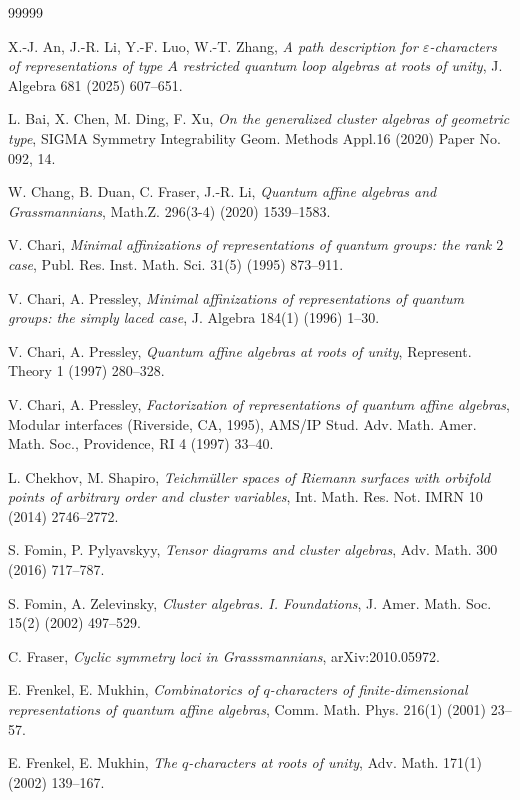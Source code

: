 \documentclass[11pt, reqno]{amsart}
\theoremstyle{plain}
\theoremstyle{definition}
\numberwithin{equation}{section}
\begin{document}
\begin{thebibliography}{99999}

 X.-J. An, J.-R. Li, Y.-F. Luo, W.-T. Zhang, \textit{A path description for $\varepsilon$-characters of representations of type $A$ restricted quantum loop algebras at roots of unity}, J. Algebra 681 (2025) 607--651.

 L. Bai, X. Chen, M. Ding, F. Xu, \textit{On the generalized cluster algebras of geometric type}, SIGMA Symmetry Integrability Geom. Methods Appl.16 (2020) Paper No. 092, 14.

 W. Chang, B. Duan, C. Fraser, J.-R. Li, \textit{Quantum affine algebras and {G}rassmannians}, Math.Z. 296(3-4) (2020) 1539--1583.

 V. Chari, \textit{Minimal affinizations of representations of quantum groups: the rank {$2$} case}, Publ. Res. Inst. Math. Sci. 31(5) (1995) 873--911.

 V. Chari, A. Pressley, \textit{Minimal affinizations of representations of quantum groups: the simply laced case}, J. Algebra 184(1) (1996) 1--30.

 V. Chari, A. Pressley, \textit{Quantum affine algebras at roots of unity}, Represent. Theory 1 (1997) 280--328.

 V. Chari, A. Pressley, \textit{Factorization of representations of quantum affine algebras}, Modular interfaces ({R}iverside, {CA}, 1995), AMS/IP Stud. Adv. Math. Amer. Math. Soc., Providence, RI 4 (1997) 33--40.
 
 L. Chekhov, M. Shapiro, \textit{Teichm\"uller spaces of {R}iemann surfaces with orbifold points of arbitrary order and cluster variables}, Int. Math. Res. Not. IMRN 10 (2014) 2746--2772.

 S. Fomin, P. Pylyavskyy, \textit{Tensor diagrams and cluster algebras}, Adv. Math. 300 (2016) 717--787.

 S. Fomin, A. Zelevinsky, \textit{Cluster algebras. {I}. {F}oundations}, J. Amer. Math. Soc. 15(2) (2002) 497--529.

 C. Fraser, \textit{Cyclic symmetry loci in Grasssmannians}, arXiv:2010.05972. 

 E. Frenkel, E. Mukhin, \textit{Combinatorics of {$q$}-characters of finite-dimensional representations of quantum affine algebras}, Comm. Math. Phys. 216(1) (2001) 23--57.
  
 E. Frenkel, E. Mukhin, \textit{The $q$-characters at roots of unity}, Adv. Math. 171(1) (2002) 139--167.


\end{thebibliography}
\end{document}
